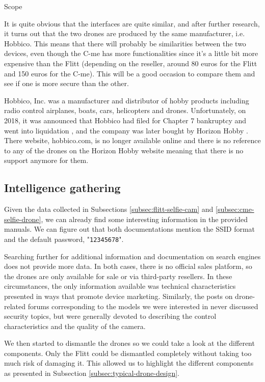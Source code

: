 \begin{chaptercover}{Scope}
\begin{tip}
It is quite obvious that the interfaces are quite similar, and after further research, it turns out that the two drones are produced by the same manufacturer, i.e. Hobbico. This means that there will probably be similarities between the two devices, even though the C-me has more functionalities since it’s a little bit more expensive than the Flitt (depending on the reseller, around 80 euros  for the Flitt and 150 euros for the C-me). This will be a good occasion to compare them and see if one is more secure than the other.
\end{tip}

\begin{info}
Hobbico, Inc. was a manufacturer and distributor of hobby products including radio control airplanes, boats, cars, helicopters and drones. Unfortunately, on 2018, it was announced that Hobbico had filed for Chapter 7 bankruptcy and went into liquidation \cite{hobbico-liquidation}, and the company was later bought by Horizon Hobby \cite{horizon-hobby}. There website, hobbico.com, is no longer available online and there is no reference to any of the drones on the Horizon Hobby website meaning that there is no support anymore for them.
\end{info}

\subsection{Intelligence gathering}

Given the data collected in Subsections \ref{subsec:flitt-selfie-cam} and \ref{subsec:cme-selfie-drone}, we can already find some interesting information in the provided manuals. We can figure out that both documentations mention the SSID format and the default password, "\texttt{12345678}".

Searching further for additional information and documentation on search engines does not provide more data. In both cases, there is no official sales platform, so the drones are only available for sale or via third-party resellers. In these circumstances, the only information available was technical characteristics presented in ways that promote device marketing. Similarly, the posts on drone-related forums corresponding to the models we were interested in never discussed security topics, but were generally devoted to describing the control characteristics and the quality of the camera.

We then started to dismantle the drones so we could take a look at the different components. Only the Flitt could be dismantled completely without taking too much risk of damaging it. This allowed us to highlight the different components as presented in Subsection \ref{subsec:typical-drone-design}.


\end{chaptercover}

